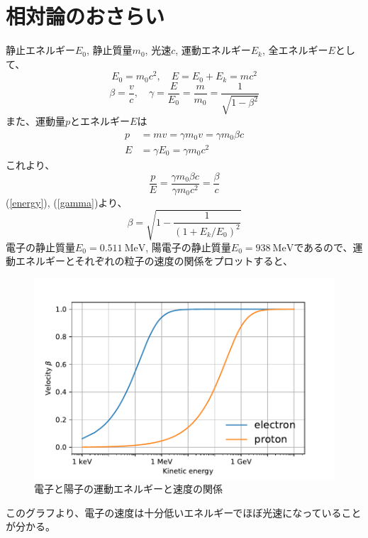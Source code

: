 \documentclass[10pt,a4paper]{ltjsarticle}
\begin{document}
\section{相対論のおさらい}
静止エネルギー$E_0$, 静止質量$m_0$, 光速$c$, 運動エネルギー$E_k$, 全エネルギー$E$として、
%
\begin{equation}
  E_0 = m_0 c^2 ,\quad E = E_0 + E_k = mc^2
  \label{energy}
\end{equation}
%
\begin{equation}
  \beta =\frac{v}{c}, \quad \gamma = \frac{E}{E_0}=\frac{m}{m_0}=\frac{1}{\sqrt{1-\beta^2}}
  \label{gamma}
\end{equation}
%
また、運動量$p$とエネルギー$E$は
\begin{align}
  p &= mv = \gamma m_0 v = \gamma m_0 \beta c \\
  E &= \gamma E_0 = \gamma m_0 c^2
\end{align}
%
これより、
%
\begin{equation}
  \frac{p}{E} = \frac{\gamma m_0 \beta c}{\gamma m_0 c^2} = \frac{\beta}{c}
\end{equation}
%
(\ref{energy}), (\ref{gamma})より、
%
\begin{equation}
  \beta = \sqrt{1-\frac{1}{\left(1+ E_k/E_0\right)^2}}
\end{equation}
%
電子の静止質量$E_0 = \SI{0.511}{\mega\electronvolt}$, 陽電子の静止質量$E_0 = \SI{938}{\mega\electronvolt}$であるので、運動エネルギーとそれぞれの粒子の速度の関係をプロットすると、
%
\begin{figure}[hhbt]
  \begin{center}
    \includegraphics[width=12cm,clip]{velocity.pdf}
    \caption{電子と陽子の運動エネルギーと速度の関係}
    \label{velocity}
  \end{center}
\end{figure}
%
このグラフより、電子の速度は十分低いエネルギーでほぼ光速になっていることが分かる。
%
\end{document}

